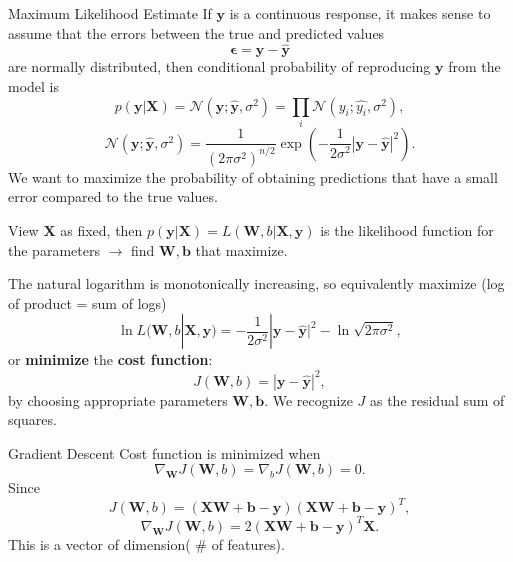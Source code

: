 \documentclass[12pt,t]{beamer}
\begin{document}
\begin{frame}{Maximum Likelihood Estimate}
If $\mathbf{y}$ is a continuous response, it makes sense to assume that the errors between the true and predicted values
$$ \mathbf{\epsilon} =\mathbf{ y} - \hat{\mathbf{y}} $$
are normally distributed, then conditional probability of reproducing $\mathbf{y}$ from the model is
$$ p(\mathbf{ y} | \mathbf{ X} ) = \mathcal{N}(\mathbf{ y}; \hat{\mathbf{ y}}, \sigma^2)= \prod_i  \mathcal{N}( y_i; \hat{ y_i}, \sigma^2),$$
$$  \mathcal{N}(\mathbf{ y}; \hat{\mathbf{ y}}, \sigma^2) 
	= \frac{1}{(2\pi \sigma^2)^{n/2}} \exp \left( - \frac{1}{2\sigma^2} |\mathbf{ y}- \hat{\mathbf{ y}} |^2 \right).$$
We want to maximize the probability of obtaining predictions that have a small error compared to the true values.

\end{frame}

\begin{frame}{}
View $\mathbf{X}$ as fixed, then  $ p(\mathbf{ y} | \mathbf{ X} ) = L(\mathbf{W}, b|\mathbf{X},\mathbf{ y} )$ is the likelihood function for the parameters $\rightarrow$ find $\mathbf{W, b}$ that maximize.

\bigskip
The natural logarithm is monotonically increasing,  so equivalently maximize (log of product = sum of logs)
$$ \ln L(\mathbf{W}, b|\mathbf{X},\mathbf{ y} ) = - \frac{1}{2\sigma^2} |\mathbf{ y}- \hat{\mathbf{ y}} |^2 - \ln \sqrt{2\pi \sigma^2},$$
or {\bf minimize} the {\bf cost function}:
$$ J(\mathbf{W}, b) = |\mathbf{ y}- \hat{\mathbf{ y}} |^2,$$
by choosing appropriate parameters $\mathbf{W, b}$.  We recognize $J$ as the residual sum of squares.

\end{frame}

\begin{frame}{Gradient Descent}
Cost function is minimized when
$$ \nabla_\mathbf{W}J(\mathbf{W}, b)  =  \nabla_b J(\mathbf{W}, b) =0.$$
Since 
$$ J(\mathbf{W}, b) =  (\mathbf{X W} + \mathbf{b} -  \mathbf{y})(\mathbf{X W} + \mathbf{b} -  \mathbf{y})^T,$$
$$ \nabla_\mathbf{W}J(\mathbf{W}, b)  =  2 (\mathbf{X W} + \mathbf{b} -  \mathbf{y})^T \mathbf{X}.$$
This is a vector of dimension( \# of features).

\end{frame}
\end{document}

